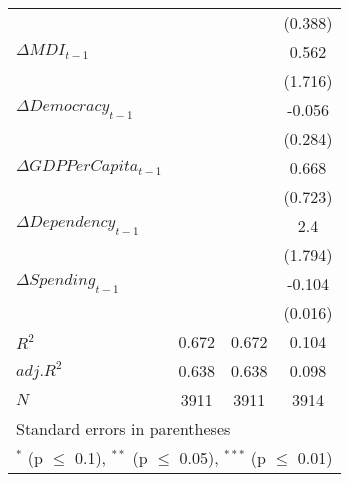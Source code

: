 \begin{table}[htbp]
\begin{tabular}{l*{3}{c}}
  		& 		& 		&(0.388) \\
$\Delta MDI_{t-1}$ 		& 		& 		&0.562 \\
  		& 		& 		&(1.716) \\
$\Delta Democracy_{t-1}$ 		& 		& 		&-0.056 \\
  		& 		& 		&(0.284) \\
$\Delta GDPPerCapita_{t-1}$ 		& 		& 		&0.668 \\
  		& 		& 		&(0.723) \\
$\Delta Dependency_{t-1}$ 		& 		& 		&2.4 \\
  		& 		& 		&(1.794) \\
$\Delta Spending_{t-1}$ 		& 		& 		&-0.104\sym{***} \\
  		& 		& 		&(0.016) \\
\hline
$R^2$ 		&0.672 		&0.672 		&0.104 \\
$adj.R^2$ 		&0.638 		&0.638 		&0.098 \\
$N$ 		&\multicolumn{1}{c}{3911} 		&\multicolumn{1}{c}{3911} 		&\multicolumn{1}{c}{3914} \\
\hline\hline
\multicolumn{4}{l}{\footnotesize Standard errors in parentheses}\\
\multicolumn{4}{l}{\footnotesize $^{*}$ (p $\le$ 0.1), $^{**}$ (p $\le$ 0.05), $^{***}$ (p $\le$ 0.01)}\\
\end{tabular}
\end{table}
